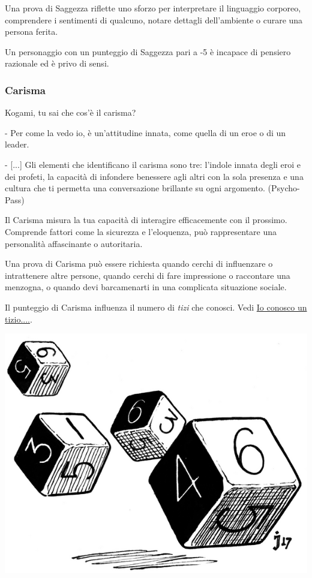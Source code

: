 \begin{multicols}{2}
Una prova di Saggezza riflette uno sforzo per interpretare il linguaggio corporeo, comprendere i sentimenti di qualcuno, notare dettagli dell'ambiente o curare una persona ferita.

Un personaggio con un punteggio di Saggezza pari a -5 è incapace di pensiero razionale ed è privo di sensi.

\subsubsection{Carisma}\label{carisma}

\begin{changemargin}{0.3cm}{0.3cm}\begin{enfasi}{
Kogami, tu sai che cos'è il carisma?

- Per come la vedo io, è un'attitudine innata, come quella di un eroe o di un leader.

- [...] Gli elementi che identificano il carisma sono tre: l'indole innata degli eroi e dei profeti, la capacità di infondere benessere agli altri con la sola presenza e una cultura che ti permetta una conversazione brillante su ogni argomento. (Psycho-Pass)
}\end{enfasi}\end{changemargin}

Il Carisma misura la tua capacità di interagire efficacemente con il prossimo. Comprende fattori come la sicurezza e l'eloquenza, può rappresentare una personalità affascinante o autoritaria.

Una prova di Carisma può essere richiesta quando cerchi di influenzare o intrattenere altre persone, quando cerchi di fare impressione o raccontare una menzogna, o quando devi barcamenarti in una complicata situazione sociale.

Il punteggio di Carisma influenza il numero di \emph{tizi} che conosci. Vedi \hyperlink{ioconoscountizio}{Io conosco un tizio....}.

\begin{center}
\includegraphics[width=0.7\linewidth]{immagini/dice4.png}
\end{center}


\end{multicols}
